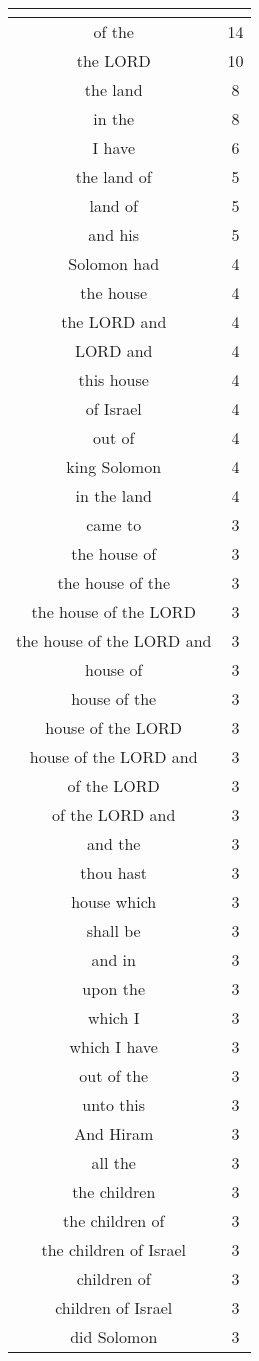 \begin{center}
\begin{longtable}{|c|c|}
\hline \multicolumn{2}{c}{{ }} \\ \hline
\endfoot 
of the & 14\\ \hline 
the LORD & 10\\ \hline 
the land & 8\\ \hline 
in the & 8\\ \hline 
I have & 6\\ \hline 
the land of & 5\\ \hline 
land of & 5\\ \hline 
and his & 5\\ \hline 
Solomon had & 4\\ \hline 
the house & 4\\ \hline 
the LORD and & 4\\ \hline 
LORD and & 4\\ \hline 
this house & 4\\ \hline 
of Israel & 4\\ \hline 
out of & 4\\ \hline 
king Solomon & 4\\ \hline 
in the land & 4\\ \hline 
came to & 3\\ \hline 
the house of & 3\\ \hline 
the house of the & 3\\ \hline 
the house of the LORD & 3\\ \hline 
the house of the LORD and & 3\\ \hline 
house of & 3\\ \hline 
house of the & 3\\ \hline 
house of the LORD & 3\\ \hline 
house of the LORD and & 3\\ \hline 
of the LORD & 3\\ \hline 
of the LORD and & 3\\ \hline 
and the & 3\\ \hline 
thou hast & 3\\ \hline 
house which & 3\\ \hline 
shall be & 3\\ \hline 
and in & 3\\ \hline 
upon the & 3\\ \hline 
which I & 3\\ \hline 
which I have & 3\\ \hline 
out of the & 3\\ \hline 
unto this & 3\\ \hline 
And Hiram & 3\\ \hline 
all the & 3\\ \hline 
the children & 3\\ \hline 
the children of & 3\\ \hline 
the children of Israel & 3\\ \hline 
children of & 3\\ \hline 
children of Israel & 3\\ \hline 
did Solomon & 3\\ \hline 
\end{longtable}
\end{center}





